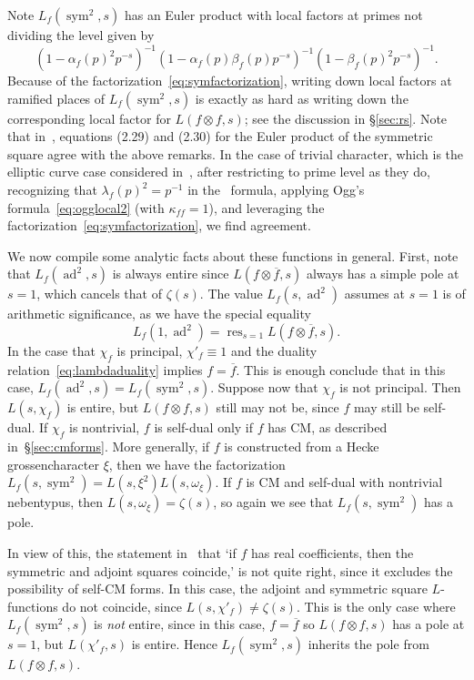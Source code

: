 \documentclass[11pt,reqno]{amsart} \usepackage{fullpage}
\newcommand\be{\begin{equation}}
\newcommand\ee{\end{equation}}
\newcommand{\Lsym}[2][]{L_f#1\left(#2,\sym^2\right)}
\newcommand{\Lad}[1]{L_f\left(#1,\ad^2\right)}
\DeclareMathOperator{\res}{res}
\DeclareMathOperator{\sym}{sym}
\DeclareMathOperator{\ad}{ad}
\numberwithin{equation}{section}
\begin{document}
Note $L_f(\sym^2,s)$ has an Euler product with local factors at primes not dividing
the level given by
\be\label{eq:symeuler}
(1-\alpha_f(p)^2p^{-s})^{-1}
(1-\alpha_f(p)\beta_f(p)p^{-s})^{-1}
(1-\beta_f(p)^2p^{-s})^{-1}.
\ee
Because of the factorization~\eqref{eq:symfactorization}, writing down local factors
at ramified places of $L_f(\sym^2,s)$ is exactly as hard as writing down the
corresponding local factor for $L(f\otimes f,s)$; see the discussion in
\S\ref{sec:rs}. Note that in~\cite{HKS}, equations (2.29) and (2.30)
for the Euler product of the symmetric square agree with the above remarks.
In the case of
trivial character, which is the elliptic curve case considered in~\cite{HKS},
after restricting to prime level as they do, recognizing that
$\lambda_f(p)^2=p^{-1}$ in the~\cite[(2.30)]{HKS} formula, applying Ogg's
formula~\eqref{eq:ogglocal2} (with $\kappa_{ff}=1$), and leveraging the
factorization~\eqref{eq:symfactorization}, we find agreement.

We now compile some analytic facts about these functions in general. First,
note that $L_f(\ad^2,s)$ is always entire since $L(f\otimes\overline f,s)$
always has a simple pole at $s=1$, which cancels that of $\zeta(s)$.
The value $\Lad{s}$ assumes at $s=1$ is of arithmetic significance, as we have the
special equality \be\label{eq:ad1}\Lad{1}=\res_{s=1}L(f\otimes\overline f,s).\ee
In the case that $\chi_f$ is principal, $\chi'_f\equiv1$ and the duality
relation~\eqref{eq:lambdaduality} implies $f=\overline f$.
This is enough conclude that in this case, $L_f(\ad^2,s) = L_f(\sym^2,s)$.
Suppose now that $\chi_f$ is not principal. Then $L(s,\chi_f)$ is entire,
but $L(f\otimes f,s)$ still may not be, since $f$ may still be self-dual.
If $\chi_f$ is nontrivial, $f$ is self-dual only if $f$ has CM, as described
in~\S\ref{sec:cmforms}. More generally, if $f$ is constructed from a Hecke grossencharacter
$\xi$, then we have the factorization $\Lsym{s}=L(s,\xi^2)L(s,\omega_\xi)$. If $f$ is CM
and self-dual with nontrivial nebentypus, then $L(s,\omega_\xi)=\zeta(s)$, so again we see
that $\Lsym{s}$ has a pole.

In view of this, the statement in~\cite[p.\,137]{IK} that `if $f$ has real
coefficients, then the symmetric and adjoint squares coincide,' is not quite
right, since it excludes the possibility of self-CM forms. In this case, the adjoint and
symmetric square $L$-functions do not coincide, since $L(s,\chi'_f)\ne\zeta(s)$. This is
the only case where $L_f(\sym^2,s)$ is \emph{not} entire, since in this case,
$f=\overline f$ so $L(f\otimes f,s)$ has a pole at $s=1$, but $L(\chi'_f,s)$ is entire.
Hence $L_f(\sym^2,s)$ inherits the pole from $L(f\otimes f,s)$.
\end{document}
